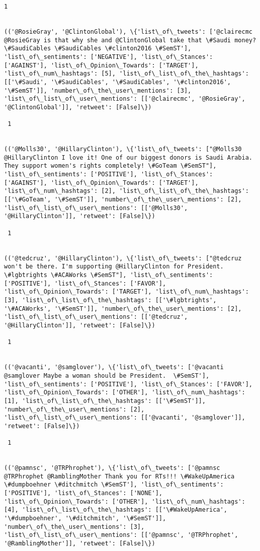 \documentclass[11pt]{article}
\begin{document}
\begin{Verbatim}[commandchars=\\\{\}]
 1
 

(('@RosieGray', '@ClintonGlobal'), \{'list\_of\_tweets': ['@clairecmc @RosieGray is that why she and @ClintonGlobal take that \#Saudi money? \#SaudiCables \#SaudiCables \#clinton2016 \#SemST'], 'list\_of\_sentiments': ['NEGATIVE'], 'list\_of\_Stances': ['AGAINST'], 'list\_of\_Opinion\_Towards': ['TARGET'], 'list\_of\_num\_hashtags': [5], 'list\_of\_list\_of\_the\_hashtags': [['\#Saudi', '\#SaudiCables', '\#SaudiCables', '\#clinton2016', '\#SemST']], 'number\_of\_the\_user\_mentions': [3], 'list\_of\_list\_of\_user\_mentions': [['@clairecmc', '@RosieGray', '@ClintonGlobal']], 'retweet': [False]\})

 1
 

(('@Molls30', '@HillaryClinton'), \{'list\_of\_tweets': ["@Molls30 @HillaryClinton I love it! One of our biggest donors is Saudi Arabia. They support women's rights completely! \#GoTeam \#SemST"], 'list\_of\_sentiments': ['POSITIVE'], 'list\_of\_Stances': ['AGAINST'], 'list\_of\_Opinion\_Towards': ['TARGET'], 'list\_of\_num\_hashtags': [2], 'list\_of\_list\_of\_the\_hashtags': [['\#GoTeam', '\#SemST']], 'number\_of\_the\_user\_mentions': [2], 'list\_of\_list\_of\_user\_mentions': [['@Molls30', '@HillaryClinton']], 'retweet': [False]\})

 1
 

(('@tedcruz', '@HillaryClinton'), \{'list\_of\_tweets': ["@tedcruz won't be there. I'm supporting @HillaryClinton for President. \#lgbtrights \#ACAWorks \#SemST"], 'list\_of\_sentiments': ['POSITIVE'], 'list\_of\_Stances': ['FAVOR'], 'list\_of\_Opinion\_Towards': ['TARGET'], 'list\_of\_num\_hashtags': [3], 'list\_of\_list\_of\_the\_hashtags': [['\#lgbtrights', '\#ACAWorks', '\#SemST']], 'number\_of\_the\_user\_mentions': [2], 'list\_of\_list\_of\_user\_mentions': [['@tedcruz', '@HillaryClinton']], 'retweet': [False]\})

 1
 

(('@vacanti', '@samglover'), \{'list\_of\_tweets': ['@vacanti @samglover Maybe a woman should be President.  \#SemST'], 'list\_of\_sentiments': ['POSITIVE'], 'list\_of\_Stances': ['FAVOR'], 'list\_of\_Opinion\_Towards': ['OTHER'], 'list\_of\_num\_hashtags': [1], 'list\_of\_list\_of\_the\_hashtags': [['\#SemST']], 'number\_of\_the\_user\_mentions': [2], 'list\_of\_list\_of\_user\_mentions': [['@vacanti', '@samglover']], 'retweet': [False]\})

 1
 

(('@pamnsc', '@TRPhrophet'), \{'list\_of\_tweets': ['@pamnsc @TRPhrophet @RamblingMother Thank you for RTs!!! \#WakeUpAmerica \#dumpboehner \#ditchmitch \#SemST'], 'list\_of\_sentiments': ['POSITIVE'], 'list\_of\_Stances': ['NONE'], 'list\_of\_Opinion\_Towards': ['OTHER'], 'list\_of\_num\_hashtags': [4], 'list\_of\_list\_of\_the\_hashtags': [['\#WakeUpAmerica', '\#dumpboehner', '\#ditchmitch', '\#SemST']], 'number\_of\_the\_user\_mentions': [3], 'list\_of\_list\_of\_user\_mentions': [['@pamnsc', '@TRPhrophet', '@RamblingMother']], 'retweet': [False]\})


\end{Verbatim}
\end{document}
